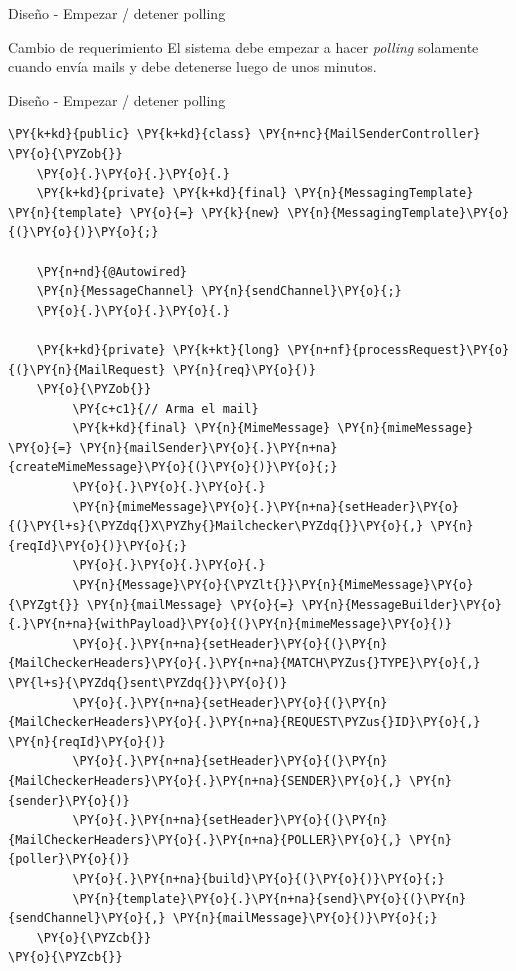 \documentclass{beamer}
\begin{document}
\begin{frame}{Diseño - Empezar / detener polling}
\begin{block}{Cambio de requerimiento}
El sistema debe empezar a hacer \textit{polling} solamente cuando envía mails y debe detenerse luego de unos minutos.
\end{block}
\end{frame}

\begin{frame}[fragile]{Diseño - Empezar / detener polling}
\begin{Verbatim}[fontsize=\tiny,commandchars=\\\{\}]
\PY{k+kd}{public} \PY{k+kd}{class} \PY{n+nc}{MailSenderController}
\PY{o}{\PYZob{}}
    \PY{o}{.}\PY{o}{.}\PY{o}{.}
    \PY{k+kd}{private} \PY{k+kd}{final} \PY{n}{MessagingTemplate} \PY{n}{template} \PY{o}{=} \PY{k}{new} \PY{n}{MessagingTemplate}\PY{o}{(}\PY{o}{)}\PY{o}{;}

    \PY{n+nd}{@Autowired}
    \PY{n}{MessageChannel} \PY{n}{sendChannel}\PY{o}{;}
    \PY{o}{.}\PY{o}{.}\PY{o}{.}

    \PY{k+kd}{private} \PY{k+kt}{long} \PY{n+nf}{processRequest}\PY{o}{(}\PY{n}{MailRequest} \PY{n}{req}\PY{o}{)}
    \PY{o}{\PYZob{}}
         \PY{c+c1}{// Arma el mail}
         \PY{k+kd}{final} \PY{n}{MimeMessage} \PY{n}{mimeMessage} \PY{o}{=} \PY{n}{mailSender}\PY{o}{.}\PY{n+na}{createMimeMessage}\PY{o}{(}\PY{o}{)}\PY{o}{;}
         \PY{o}{.}\PY{o}{.}\PY{o}{.}
         \PY{n}{mimeMessage}\PY{o}{.}\PY{n+na}{setHeader}\PY{o}{(}\PY{l+s}{\PYZdq{}X\PYZhy{}Mailchecker\PYZdq{}}\PY{o}{,} \PY{n}{reqId}\PY{o}{)}\PY{o}{;}
         \PY{o}{.}\PY{o}{.}\PY{o}{.}
         \PY{n}{Message}\PY{o}{\PYZlt{}}\PY{n}{MimeMessage}\PY{o}{\PYZgt{}} \PY{n}{mailMessage} \PY{o}{=} \PY{n}{MessageBuilder}\PY{o}{.}\PY{n+na}{withPayload}\PY{o}{(}\PY{n}{mimeMessage}\PY{o}{)}
         \PY{o}{.}\PY{n+na}{setHeader}\PY{o}{(}\PY{n}{MailCheckerHeaders}\PY{o}{.}\PY{n+na}{MATCH\PYZus{}TYPE}\PY{o}{,} \PY{l+s}{\PYZdq{}sent\PYZdq{}}\PY{o}{)}
         \PY{o}{.}\PY{n+na}{setHeader}\PY{o}{(}\PY{n}{MailCheckerHeaders}\PY{o}{.}\PY{n+na}{REQUEST\PYZus{}ID}\PY{o}{,} \PY{n}{reqId}\PY{o}{)}
         \PY{o}{.}\PY{n+na}{setHeader}\PY{o}{(}\PY{n}{MailCheckerHeaders}\PY{o}{.}\PY{n+na}{SENDER}\PY{o}{,} \PY{n}{sender}\PY{o}{)}
         \PY{o}{.}\PY{n+na}{setHeader}\PY{o}{(}\PY{n}{MailCheckerHeaders}\PY{o}{.}\PY{n+na}{POLLER}\PY{o}{,} \PY{n}{poller}\PY{o}{)}
         \PY{o}{.}\PY{n+na}{build}\PY{o}{(}\PY{o}{)}\PY{o}{;}
         \PY{n}{template}\PY{o}{.}\PY{n+na}{send}\PY{o}{(}\PY{n}{sendChannel}\PY{o}{,} \PY{n}{mailMessage}\PY{o}{)}\PY{o}{;}
    \PY{o}{\PYZcb{}}
\PY{o}{\PYZcb{}}
\end{Verbatim}
\end{frame}
\end{document}
